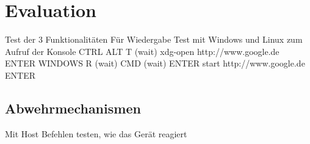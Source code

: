 \chapter{Evaluation}
Test der 3 Funktionalitäten
Für Wiedergabe Test mit Windows und Linux zum Aufruf der Konsole
CTRL ALT T (wait)
xdg-open http://www.google.de ENTER
WINDOWS R (wait) CMD (wait) ENTER
start http://www.google.de ENTER


\section{Abwehrmechanismen}
Mit Host Befehlen testen, wie das Gerät reagiert \cite{mihailowitsch}